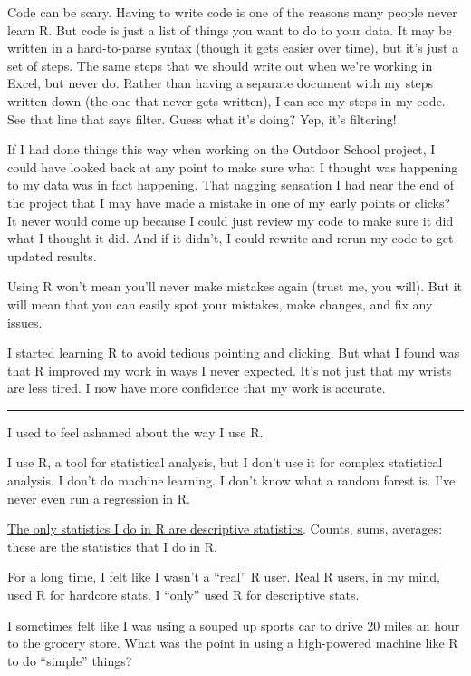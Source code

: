 \documentclass[
]{book}
\begin{document}
Code can be scary. Having to write code is one of the reasons many people never learn R. But code is just a list of things you want to do to your data. It may be written in a hard-to-parse syntax (though it gets easier over time), but it's just a set of steps. The same steps that we should write out when we're working in Excel, but never do. Rather than having a separate document with my steps written down (the one that never gets written), I can see my steps in my code. See that line that says filter. Guess what it's doing? Yep, it's filtering!

If I had done things this way when working on the Outdoor School project, I could have looked back at any point to make sure what I thought was happening to my data was in fact happening. That nagging sensation I had near the end of the project that I may have made a mistake in one of my early points or clicks? It never would come up because I could just review my code to make sure it did what I thought it did. And if it didn't, I could rewrite and rerun my code to get updated results.

Using R won't mean you'll never make mistakes again (trust me, you will). But it will mean that you can easily spot your mistakes, make changes, and fix any issues.

I started learning R to avoid tedious pointing and clicking. But what I found was that R improved my work in ways I never expected. It's not just that my wrists are less tired. I now have more confidence that my work is accurate.

\begin{center}\rule{0.5\linewidth}{0.5pt}\end{center}

I used to feel ashamed about the way I use R.

I use R, a tool for statistical analysis, but I don't use it for complex statistical analysis. I don't do machine learning. I don't know what a random forest is. I've never even run a regression in R.

\href{https://rfortherestofus.com/2018/12/descriptive-stats-r/}{The only statistics I do in R are descriptive statistics}. Counts, sums, averages: these are the statistics that I do in R.

For a long time, I felt like I wasn't a ``real'' R user. Real R users, in my mind, used R for hardcore stats. I ``only'' used R for descriptive stats.

I sometimes felt like I was using a souped up sports car to drive 20 miles an hour to the grocery store. What was the point in using a high-powered machine like R to do ``simple'' things?
\end{document}
